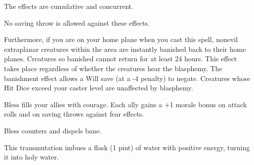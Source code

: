 \begin{multicols}{2}
\begin{small}
\smallskip\noindent The effects are cumulative and concurrent.

\smallskip\noindent No saving throw is allowed against these effects.


\smallskip\noindent Furthermore, if you are on your home plane when you cast this spell, nonevil extraplanar creatures within the area are instantly banished back to their home planes. Creatures so banished cannot return for at least 24 hours. This effect takes place regardless of whether the creatures hear the blasphemy. The banishment effect allows a Will save (at a -4 penalty) to negate. Creatures whose Hit Dice exceed your caster level are unaffected by blasphemy.

\noindent Bless fills your allies with courage. Each ally gains a +1 morale bonus on attack rolls and on saving throws against fear effects.

\smallskip\noindent Bless counters and dispels bane.

\noindent This transmutation imbues a flask (1 pint) of water with positive energy, turning it into holy water.



\end{small}
\end{multicols}
